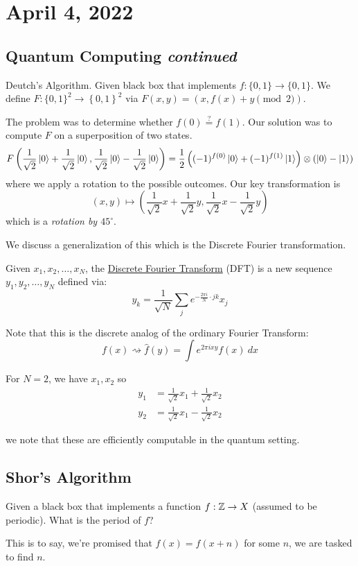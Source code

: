 \section{April 4, 2022}
\subsection{Quantum Computing \emph{continued}}
\recall Deutch's Algorithm. Given black box that implements $f : \{0, 1\}\to \{0, 1\}$. We define $F : \{0, 1\}^2\to \left\{ 0, 1 \right\}^2$ via $F(x, y) = (x, f(x) + y\pmod{2})$.

The problem was to determine whether $f(0) \overset{?}{=}f(1)$. Our solution was to compute $F$ on a superposition of two states.
\[F\left(\frac{1}{\sqrt{2}}\Ket{0} + \frac{1}{\sqrt{2}}\Ket{0}, \frac{1}{\sqrt{2}}\Ket{0} - \frac{1}{\sqrt{2}}\Ket{0}\right) = \frac{1}{2}\left((-1)^{f(0)}\Ket{0} + (-1)^{f(1)}\Ket{1}\right)\otimes\left( \Ket{0} - \Ket{1} \right)\]
where we apply a rotation to the possible outcomes. Our key transformation is
\[(x, y)\mapsto \left( \frac{1}{\sqrt{2}}x + \frac{1}{\sqrt{2}}y,  \frac{1}{\sqrt{2}}x - \frac{1}{\sqrt{2}}y \right)\]
which is a \emph{rotation by $45^\circ$}.

We discuss a generalization of this which is the Discrete Fourier transformation.
\begin{definition}
    Given $x_1, x_2, \dots, x_N$, the \ul{Discrete Fourier Transform} (DFT) is a new sequence $y_1, y_2, \dots, y_N$ defined via:
    \[y_k = \frac{1}{\sqrt{N}}\sum_{j} e^{-\frac{2\pi i}{N}\cdot jk}x_j\]
\end{definition}

Note that this is the discrete analog of the ordinary Fourier Transform:
\[f(x)\rightsquigarrow \hat{f}(y) = \int e^{2\pi ixy}f(x)\ dx\]

\begin{example}
    For $N = 2$, we have $x_1, x_2$ so
    \begin{align*}
        y_1 & = \frac{1}{\sqrt{2}}x_1 + \frac{1}{\sqrt{2}}x_2 \\
        y_2 & = \frac{1}{\sqrt{2}}x_1 - \frac{1}{\sqrt{2}}x_2
    \end{align*}
\end{example}
we note that these are efficiently computable in the quantum setting.

\subsection{Shor's Algorithm}
\begin{ques*}
    Given a black box that implements a function $f : \mathbb Z \to X$ (assumed to be periodic). What is the period of $f$?

    This is to say, we're promised that $f(x) = f(x + n)$ for some $n$, we are tasked to find $n$.
\end{ques*}

